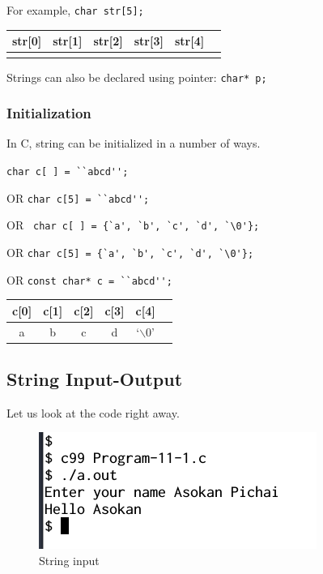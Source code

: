 \documentclass[11pt,a4paper]{article}
\begin{document}
For example, \lstinline!char str[5];! 

\begin{table}[ht]
\centering
\begin{tabular}{|c|c|c|c|c|c|}
str[0] & str[1] & str[2] & str[3] & str[4]\\\hline
& & & & \\\hline
\end{tabular}
\end{table}

Strings can also be declared using pointer: \lstinline!char* p;!

\subsubsection*{Initialization}

In C, string can be initialized in a number of ways.

\lstinline!char c[ ] = ``abcd'';! 

OR \lstinline!char c[5] = ``abcd'';! 

OR \lstinline! char c[ ] = {`a', `b', `c', `d', `\0'};! 

OR \lstinline!char c[5] = {`a', `b', `c', `d', `\0'};! 

OR \lstinline!const char* c = ``abcd'';!

\begin{table}[ht]
\centering
\begin{tabular}{|c|c|c|c|c|c|}\hline
 c[0] & c[1] & c[2] & c[3] & c[4]\\\hline
 a & b & c & d & `$\backslash$0' \\\hline
\end{tabular}
\end{table}

\subsection*{String Input-Output} 
Let us look at the code right away.


\begin{figure}[ht]
\begin{center}
\includegraphics[scale=0.6]{Output-11-1.png}
\end{center}
\caption{String input}
\label{output-11-1}
\end{figure}
\end{document}
